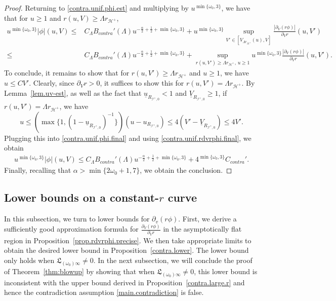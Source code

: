 \documentclass[10pt, reqno]{amsart}
\theoremstyle{definition}
\theoremstyle{remark}
\theoremstyle{conjecture}
\numberwithin{equation}{section}
\newcommand{\rd}{\partial}
\newcommand{\0}{\emptyset}
\newcommand{\alp}{\alpha}
\newcommand{\omg}{\omega}
\newcommand{\calH}{\mathcal H}
\newcommand{\calI}{\mathcal I}
\newcommand{\f}{\frac}
\newcommand{\EH}{\calH^{+}}
\newcommand{\NI}{\calI^{+}}						%
\newcommand{\ub}{\underline{u}}
\newcommand{\Vb}{\underline{V}}
\begin{document}
\begin{proof}
Returning to \eqref{contra.unif.phi.est} and multiplying by $u^{\min\{\omg_0,3\}}$, we have that for $u\geq 1$ and $r(u,V)\geq \Lambda r_{\EH}$,
\begin{equation}\label{contra.unif.phi.final}
\begin{split}
u^{\min\{\omg_0,3\}}|\phi|(u,V)\leq &C_{\Lambda} B_{contra}'(\Lambda) u^{-\f{\alp}{2}+\f{1}{2}+\min\{\omg_0,3\}}+u^{\min\{\omg_0,3\}}\sup_{V'\in [V_{\Lambda r_{\EH}}(u),V]}\f{|\rd_V(r\phi)|}{\rd_V r}(u,V')\\
\leq &C_{\Lambda}B_{contra}'(\Lambda) u^{-\f{\alp}{2}+\f{1}{2}+\min\{\omg_0,3\}}+\sup_{r(u,V')\geq \Lambda r_{\EH},\, u\geq 1} u^{\min\{\omg_0,3\}}\f{|\rd_V(r\phi)|}{\rd_V r}(u,V').
\end{split}
\end{equation}
To conclude, it remains to show that for $r(u,V')\geq \Lambda r_{\EH}$ and $u\geq 1$, we have $u\leq CV'$. Clearly, since $\rd_V r>0$, it suffices to show this for $r(u,V')=\Lambda r_{\EH}$. By Lemma~\ref{lem.uv-est}, as well as the fact that $\ub_{R_{\NI,0}}<1$ and $\Vb_{R_{\NI,0}} \geq 1$, if $r(u,V')=\Lambda r_{\EH}$, we have
$$u\leq \left(\max\{1, (1-\ub_{R_{\NI,0}})^{-1}\}\right)(u-u_{R_{\NI,0}}) \leq 4 (V' - \Vb_{R_{\NI,0}}) \leq 4 V'.$$
Plugging this into \eqref{contra.unif.phi.final} and using \eqref{contra.unif.rdvrphi.final}, we obtain
\begin{equation}\label{contra.unif.uv.final}
\begin{split}
u^{\min\{\omg_0,3\}}|\phi|(u,V)\leq C_{\Lambda}B_{contra}'(\Lambda) u^{-\f{\alp}{2}+\f{1}{2}+\min\{\omg_0,3\}}+4^{\min\{\omg_0,3\}} C_{contra}'.
\end{split}
\end{equation}
Finally, recalling that $\alp>\min\{2\omg_0+1, 7\}$, we obtain the conclusion. \qedhere
\end{proof}

\subsection{Lower bounds on a constant-$r$ curve} \label{subsec:blowup-const-r}

In this subsection, we turn to lower bounds for $\rd_v(r\phi)$. First, we derive a sufficiently good approximation formula for $\f{\rd_V(r\phi)}{\rd_V r}$ in the asymptotically flat region in Proposition~\ref{prop.rdvrphi.precise}. We then take appropriate limits to obtain the desired lower bound in Proposition~\ref{contra.lower}. The lower bound only holds when $\mathfrak L_{(\omg_0)\infty}\neq 0$. In the next subsection, we will conclude the proof of Theorem~\ref{thm:blowup} by showing that when $\mathfrak L_{(\omg_0)\infty}\neq 0$, this lower bound is inconsistent with the upper bound derived in Proposition~\ref{contra.large.r} and hence the contradiction assumption \eqref{main.contradiction} is false.
\end{document}
